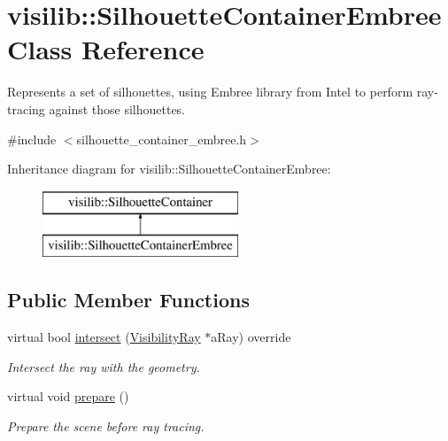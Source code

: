 \hypertarget{classvisilib_1_1_silhouette_container_embree}{}\section{visilib\+::Silhouette\+Container\+Embree Class Reference}
\label{classvisilib_1_1_silhouette_container_embree}


Represents a set of silhouettes, using Embree library from Intel to perform ray-\/tracing against those silhouettes.  




{\ttfamily \#include $<$silhouette\+\_\+container\+\_\+embree.\+h$>$}

Inheritance diagram for visilib\+::Silhouette\+Container\+Embree\+:\begin{figure}[H]
\begin{center}
\leavevmode
\includegraphics[height=2.000000cm]{classvisilib_1_1_silhouette_container_embree}
\end{center}
\end{figure}
\subsection*{Public Member Functions}
\begin{DoxyCompactItemize}
\item 
virtual bool \mbox{\hyperlink{classvisilib_1_1_silhouette_container_embree_a3cc23503bfa6f2db55762cf0851d6c69}{intersect}} (\mbox{\hyperlink{structvisilib_1_1_visibility_ray}{Visibility\+Ray}} $\ast$a\+Ray) override
\begin{DoxyCompactList}\small\item\em Intersect the ray with the geometry. \end{DoxyCompactList}\item 
virtual void \mbox{\hyperlink{classvisilib_1_1_silhouette_container_embree_ad3d6193f5484b3fb56096efd8a1230a8}{prepare}} ()
\begin{DoxyCompactList}\small\item\em Prepare the scene before ray tracing. \end{DoxyCompactList}\end{DoxyCompactItemize}

